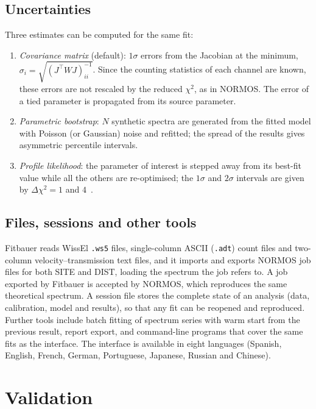 \documentclass[smallcondensed]{svjour3}
\begin{document}
\subsection{Uncertainties}

Three estimates can be computed for the same fit:
\begin{enumerate}
  \item \emph{Covariance matrix} (default): $1\sigma$ errors from the
    Jacobian at the minimum, $\sigma_i = \sqrt{(J^\top W J)^{-1}_{ii}}$.
    Since the counting statistics of each channel are known, these errors
    are not rescaled by the reduced $\chi^2$, as in NORMOS.
    The error of a tied parameter is propagated from its source parameter.
  \item \emph{Parametric bootstrap}: $N$ synthetic spectra are generated
    from the fitted model with Poisson (or Gaussian) noise and refitted;
    the spread of the results gives asymmetric percentile intervals.
  \item \emph{Profile likelihood}: the parameter of interest is stepped
    away from its best-fit value while all the others are re-optimised;
    the $1\sigma$ and $2\sigma$ intervals are given by
    $\Delta\chi^2 = 1$ and $4$~\cite{Rolke2005}.
\end{enumerate}

\subsection{Files, sessions and other tools}

Fitbauer reads WissEl \texttt{.ws5} files, single-column ASCII
(\texttt{.adt}) count files and two-column velocity--transmission text
files, and it
imports and exports NORMOS job files for both SITE and DIST, loading the
spectrum the job refers to. A job exported by Fitbauer is accepted by
NORMOS, which reproduces the same theoretical spectrum.
A session file stores the complete state of an analysis (data,
calibration, model and results), so that any fit can be reopened and
reproduced. Further tools include batch fitting of spectrum series with
warm start from the previous result, report export, and command-line
programs that cover the same fits as the interface. The interface is
available in eight languages (Spanish, English, French, German,
Portuguese, Japanese, Russian and Chinese).

\section{Validation}
\label{sec:validation}
\end{document}
